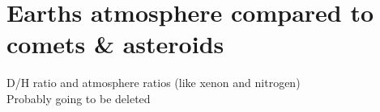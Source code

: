 \documentclass[11pt]{article}
\begin{document}
\newpage
\section{Earths atmosphere compared to comets \& asteroids}
D/H ratio and atmosphere ratios (like xenon and nitrogen)\\
Probably going to be deleted


\newpage				%



\newpage				%



\newpage				%


\end{document}
